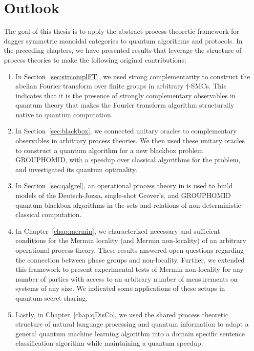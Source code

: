 \chapter{Outlook}
\label{chap:outlook}

The goal of this thesis is to apply the abstract process theoretic framework for dagger symmetric monoidal categories to quantum algorithms and protocols.  In the preceding chapters, we have presented results that leverage the structure of process theories to make the following original contributions:
\begin{enumerate}
\item In Section~\ref{sec:strcomplFT}, we used strong complementarity to construct the abelian Fourier transform over finite groups in arbitrary $\dagger$-SMCs. This indicates that it is the presence of strongly complementary observables in quantum theory that makes the Fourier transform algorithm structurally native to quantum computation.

\item In Section~\ref{sec:blackbox}, we connected unitary oracles to complementary observables in arbitrary process theories. We then used these unitary oracles to construct a quantum algorithm for a new blackbox problem GROUPHOMID, with a speedup over classical algorithms for the problem, and investigated its quantum optimality.

\item In Section~\ref{sec:qalgrel}, an operational process theory in  is used to build models of the Deutsch-Jozsa, single-shot Grover's, and GROUPHOMID quantum blackbox algorithms in the sets and relations of non-deterministic classical computation.

\item In Chapter~\ref{chap:mermin}, we characterized necessary and sufficient conditions for the Mermin locality (and Mermin non-locality) of an arbitrary operational process theory. These results answered open questions regarding the connection between phase groups and non-locality. Further, we extended this framework to present experimental tests of Mermin non-locality for any number of parties with access to an arbitrary number of measurements on systems of any size. We indicated some applications of these setups in quantum secret sharing.

\item Lastly, in Chapter~\ref{chap:qDisCo}, we used the shared process theoretic structure of natural language processing and quantum information to adapt a general quantum machine learning algorithm into a domain specific sentence classification algorithm while maintaining a quantum speedup.
\end{enumerate}

